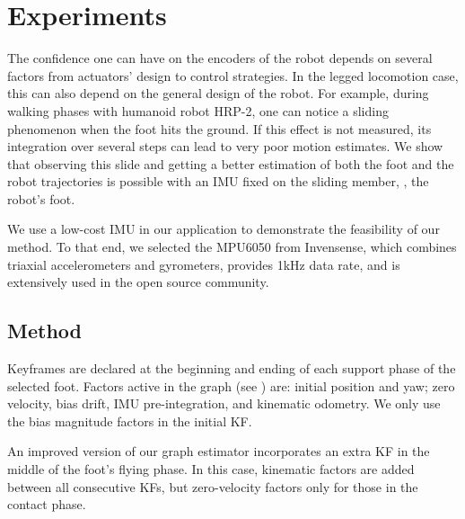 
\section{Experiments} \label{sec:experiments}

The confidence one can have on the encoders of the robot depends on several factors from actuators' design to control strategies. 
In the legged locomotion case, this can also depend on the general design of the robot.
For example, during walking phases with humanoid robot HRP-2, one can notice a sliding phenomenon when the foot hits the ground. 
If this effect is not measured, its integration over several steps can lead to very poor motion estimates. 
We show that observing this slide and getting a better estimation of both the foot and the robot trajectories is possible with an IMU fixed on the sliding member, \ie, the robot's foot.

We use a low-cost IMU in our application to demonstrate the feasibility of our method. 
To that end, we selected the MPU6050 from Invensense, which combines triaxial accelerometers and gyrometers, provides 1kHz data rate, and is extensively used in the open source community.

\subsection{Method}


Keyframes are declared at the beginning and ending of each support phase of the selected foot. Factors active in the graph (see ) are: initial position and yaw; zero velocity, bias drift, IMU pre-integration, and kinematic odometry. We only use the bias magnitude factors in the initial KF.

An improved version of our graph estimator incorporates an extra KF in the middle of the foot's flying phase. In this case, kinematic factors are added between all consecutive KFs, but zero-velocity factors only for those in the contact phase.

%

